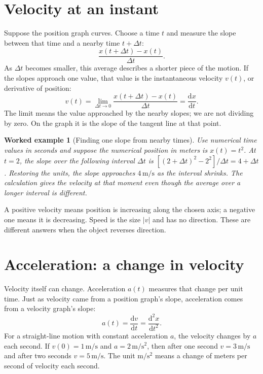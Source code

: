\documentclass[11pt,oneside]{book}
\newcommand{\dd}{\mathrm{d}}
\newcommand{\od}[2]{\frac{\dd #1}{\dd #2}}
\theoremstyle{reviewstyle}
\newtheorem{example}{Worked example}[chapter]
\begin{document}
\section{Velocity at an instant}
Suppose the position graph curves. Choose a time $t$ and measure the slope between that time and a nearby time $t+\Delta t$:
\begin{equation}
\frac{x(t+\Delta t)-x(t)}{\Delta t}.
\end{equation}
As $\Delta t$ becomes smaller, this average describes a shorter piece of the motion. If the slopes approach one value, that value is the instantaneous velocity $v(t)$, or derivative of position:
\begin{equation}
v(t)=\lim_{\Delta t\to0}\frac{x(t+\Delta t)-x(t)}{\Delta t}
=\od{x}{t}.
\end{equation}
The limit means the value approached by the nearby slopes; we are not dividing by zero. On the graph it is the slope of the tangent line at that point.

\begin{example}[Finding one slope from nearby times]
Use numerical time values in seconds and suppose the numerical position in meters is $x(t)=t^2$. At $t=2$, the slope over the following interval $\Delta t$ is $[(2+\Delta t)^2-2^2]/\Delta t=4+\Delta t$. Restoring the units, the slope approaches $4\,\mathrm{m/s}$ as the interval shrinks. The calculation gives the velocity at that moment even though the average over a longer interval is different.
\end{example}

A positive velocity means position is increasing along the chosen axis; a negative one means it is decreasing. Speed is the size $|v|$ and has no direction. These are different answers when the object reverses direction.

\section{Acceleration: a change in velocity}
Velocity itself can change. Acceleration $a(t)$ measures that change per unit time. Just as velocity came from a position graph's slope, acceleration comes from a velocity graph's slope:
\begin{equation}
a(t)=\od{v}{t}=\frac{\dd^2x}{\dd t^2}.
\end{equation}
For a straight-line motion with constant acceleration $a$, the velocity changes by $a$ each second. If $v(0)=1\,\mathrm{m/s}$ and $a=2\,\mathrm{m/s^2}$, then after one second $v=3\,\mathrm{m/s}$ and after two seconds $v=5\,\mathrm{m/s}$. The unit $\mathrm{m/s^2}$ means a change of meters per second of velocity each second.
\end{document}
